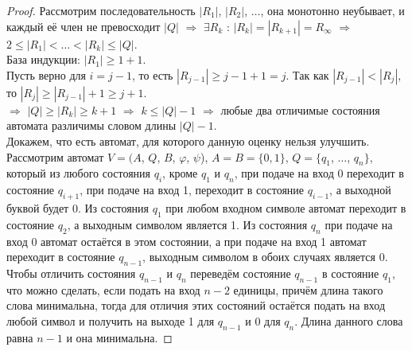 \documentclass[a4paper, 12pt]{article}
\renewcommand{\phi}{\varphi}
\theoremstyle{definition}
\theoremstyle{plain}
\theoremstyle{remark}
\begin{document}
\begin{proof}
    Рассмотрим последовательность $|R_1|$, $|R_2|$, $\ldots$, она монотонно неубывает, и каждый её член не превосходит $|Q|$ $\Longrightarrow$ $\exists R_k$ : $|R_k|=|R_{k+1}|=R_{\infty}$ $\Longrightarrow$ $2\leqslant|R_1|<\ldots<|R_k|\leqslant|Q|$.\\
    База индукции: $|R_1|\geqslant1+1$.\\
    Пусть верно для $i=j-1$, то есть $|R_{j-1}|\geqslant j-1+1=j$. Так как $|R_{j-1}|<|R_j|$, то $|R_j|\geqslant|R_{j-1}|+1\geqslant j+1$.\\
    $\Longrightarrow$ $|Q|\geqslant|R_k|\geqslant k+1$ $\Longrightarrow$ $k\leqslant|Q|-1$ $\Longrightarrow$ любые два отличимые состояния автомата различимы словом длины $|Q|-1$.\\
    Докажем, что есть автомат, для которого данную оценку нельзя улучшить. Рассмотрим автомат $V=(A$, $Q$, $B$, $\phi$, $\psi$), $A=B=\{0,1\}$, $Q=\{q_1$, $\ldots$, $q_n\}$, который из любого состояния $q_i$, кроме $q_1$ и $q_n$, при подаче на вход 0 переходит в состояние $q_{i+1}$, при подаче на вход 1, переходит в состояние $q_{i-1}$, а выходной буквой будет 0. Из состояния $q_1$ при любом входном символе автомат переходит в состояние $q_2$, а выходным символом является 1. Из состояния $q_n$ при подаче на вход 0 автомат остаётся в  этом состоянии, а при подаче на вход 1 автомат переходит в состояние $q_{n-1}$, выходным символом в обоих случаях является 0.\\
    Чтобы отличить состояния $q_{n-1}$ и $q_n$ переведём состояние $q_{n-1}$ в состояние $q_1$, что можно сделать, если подать на вход $n-2$ единицы, причём длина такого слова минимальна, тогда для отличия этих состояний остаётся подать на вход любой символ и получить на выходе 1 для $q_{n-1}$ и 0 для $q_n$. Длина данного слова равна $n-1$ и она минимальна.
  \end{proof}
\end{document}
